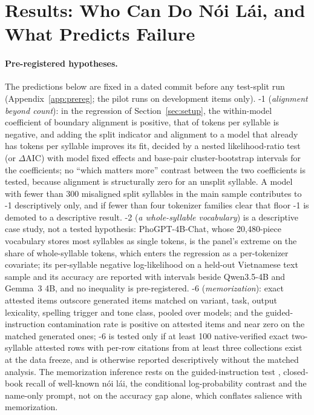 \section{Results: Who Can Do Nói Lái, and What Predicts Failure}
\label{sec:results}

\paragraph{Pre-registered hypotheses.}
The predictions below are fixed in a dated commit before any test-split run (Appendix~\ref{app:prereg}; the pilot runs on development items only). \hyp{1} (\emph{alignment beyond count}): in the regression of Section~\ref{sec:setup}, the within-model coefficient of boundary alignment is positive, that of tokens per syllable is negative, and adding the split indicator and alignment to a model that already has tokens per syllable improves its fit, decided by a nested likelihood-ratio test (or $\Delta$AIC) with model fixed effects and base-pair cluster-bootstrap intervals for the coefficients; no ``which matters more'' contrast between the two coefficients is tested, because alignment is structurally zero for an unsplit syllable. A model with fewer than 300 misaligned split syllables in the main sample contributes to \hyp{1} descriptively only, and if fewer than four tokenizer families clear that floor \hyp{1} is demoted to a descriptive result. \hyp{2} (\emph{a whole-syllable vocabulary}) is a descriptive case study, not a tested hypothesis: PhoGPT-4B-Chat, whose 20,480-piece vocabulary stores most syllables as single tokens, is the panel's extreme on the share of whole-syllable tokens, which enters the regression as a per-tokenizer covariate; its per-syllable negative log-likelihood on a held-out Vietnamese text sample and its  accuracy are reported with intervals beside Qwen3.5-4B and Gemma~3 4B, and no inequality is pre-registered. \hyp{6} (\emph{memorization}): exact attested items outscore generated items matched on variant, task, output lexicality, spelling trigger and tone class, pooled over models; and the guided-instruction contamination rate is positive on attested items and near zero on the matched generated ones; \hyp{6} is tested only if at least 100 native-verified exact two-syllable attested rows with per-row citations from at least three collections exist at the data freeze, and is otherwise reported descriptively without the matched analysis. The memorization inference rests on the guided-instruction test \citep{2308.08493}, closed-book recall of well-known nói lái, the conditional log-probability contrast and the name-only prompt, not on the accuracy gap alone, which conflates salience with memorization.

